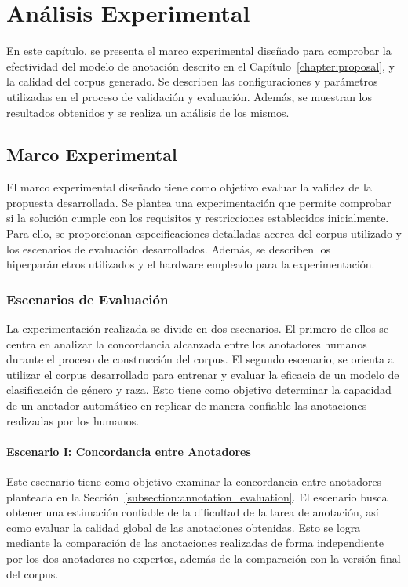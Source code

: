 \chapter{An\'alisis Experimental}\label{chapter:implementation}
En este cap\'itulo, se presenta el marco experimental dise\~nado para comprobar la efectividad del modelo de anotaci\'on 
descrito en el Cap\'itulo~\ref{chapter:proposal}, y la calidad del corpus generado. Se describen las configuraciones y 
par\'ametros utilizadas en el proceso de validaci\'on y evaluaci\'on. Adem\'as, se muestran los resultados obtenidos y 
se realiza un an\'alisis de los mismos.

\section{Marco Experimental}\label{section:experimental_framework}
El marco experimental dise\~nado tiene como objetivo evaluar la validez de la propuesta desarrollada. Se plantea 
una experimentaci\'on que permite comprobar si la soluci\'on cumple con los requisitos y restricciones establecidos inicialmente.
Para ello, se proporcionan especificaciones detalladas acerca del corpus utilizado y los escenarios de evaluaci\'on desarrollados.
Adem\'as, se describen los hiperpar\'ametros utilizados y el hardware empleado para la experimentaci\'on.

\subsection{Escenarios de Evaluaci\'on}
La experimentaci\'on realizada se divide en dos escenarios. El primero de ellos se centra en analizar la concordancia alcanzada entre 
los anotadores humanos durante el proceso de construcci\'on del corpus. El segundo escenario, se orienta a utilizar el corpus 
desarrollado para entrenar y evaluar la eficacia de un modelo de clasificaci\'on de g\'enero y raza. Esto tiene como objetivo determinar
la capacidad de un anotador autom\'atico en replicar de manera confiable las anotaciones realizadas por los humanos. 

\subsubsection{Escenario I: Concordancia entre Anotadores}\label{subsection:scenery1}
Este escenario tiene como objetivo examinar la concordancia entre anotadores planteada en la 
Secci\'on~\ref{subsection:annotation_evaluation}. El escenario busca obtener una estimaci\'on confiable de la dificultad de la 
tarea de anotaci\'on, as\'i como evaluar la calidad global de las anotaciones obtenidas. Esto se logra mediante la comparaci\'on
de las anotaciones realizadas de forma independiente por los dos anotadores no expertos, adem\'as de la comparaci\'on con la 
versi\'on final del corpus.

